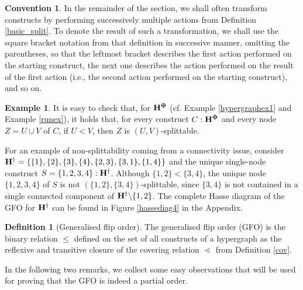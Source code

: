 \documentclass{article}
\theoremstyle{plain}
\theoremstyle{definition}
\newtheorem{definition}[thm]{Definition}
\newtheorem{convention}[thm]{Convention}
\newtheorem{example}[thm]{\sc Example}
\begin{document}
\begin{convention}
In the remainder of the section, we shall often transform constructs by performing successively multiple actions from Definition \ref{basic_split}. To denote the result of such a transformation, we shall use the square bracket notation from that definition in successive manner, omitting the parentheses, so that the leftmost bracket describes the first action performed on the starting construct, the next one describes the action performed on the result of the first action (i.e., the second action performed on the starting construct), and so on. 
\end{convention}

\begin{example}\label{Exple27}
It is easy to check that, for ${\bf H}^\maltese$ (cf. Example \ref{hypergraphex1} and Example \ref{runex}), it holds that, for every construct $C:{\bf H}^\maltese$ and every node $Z=U\cup V$ of $C$, if $U<V$, then $Z$ is $(U,V)$-splittable.


For an example of non-splittability coming from a connectivity issue, consider ${\bf H}^\dag=\{\{1\},\{2\},\{3\},\{4\},\{2,3\},\{3,1\},\{1,4\}\}$ and the unique single-node construct $S=\{1,2,3,4\}:{\bf H}^\dag$. Although $\{1,2\}<\{3,4\}$, the unique node $\{1,2,3,4\}$ of $S$ is not $(\{1,2\},\{3,4\})$-splittable, since $\{3,4\}$ is not contained in a single connected component of ${\bf H}^\dag\backslash\{1,2\}$. The complete Hasse diagram of the GFO for ${\bf H}^\dag$ can be found in Figure \ref{hassediag4} in the Appendix.
\end{example}

 

\begin{definition}[Generalised flip order]
The generalised flip order (GFO) is the binary relation $\leq$ defined on the set of all constructs of a hypergraph as the reflexive and transitive closure of the covering relation $\lessdot$ from Definition \ref{cov}.
\end{definition}



In the following two remarks, we collect some easy observations that will be used for proving that the GFO is indeed a partial order.
\end{document}
